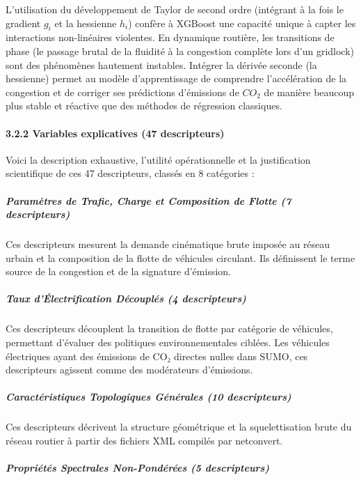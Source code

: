 \documentclass[10pt, a4paper]{article}
\begin{document}
L'utilisation du développement de Taylor de second ordre (intégrant à la
fois le gradient \(g_i\) et la hessienne \(h_i\)) confère à XGBoost une
capacité unique à capter les interactions non-linéaires violentes. En
dynamique routière, les transitions de phase (le passage brutal de la
fluidité à la congestion complète lors d'un gridlock) sont des
phénomènes hautement instables. Intégrer la dérivée seconde (la
hessienne) permet au modèle d'apprentissage de comprendre l'accélération
de la congestion et de corriger ses prédictions d'émissions de \(CO_2\)
de manière beaucoup plus stable et réactive que des méthodes de
régression classiques.

\paragraph{3.2.2 Variables explicatives (47
descripteurs)}\label{variables-explicatives-47-descripteurs}

Voici la description exhaustive, l'utilité opérationnelle et la
justification scientifique de ces 47 descripteurs, classés en 8
catégories :

\subparagraph{Paramètres de Trafic, Charge et Composition de Flotte (7
descripteurs)}\label{paramuxe8tres-de-trafic-charge-et-composition-de-flotte-7-descripteurs}

Ces descripteurs mesurent la demande cinématique brute imposée au réseau
urbain et la composition de la flotte de véhicules circulant. Ils
définissent le terme source de la congestion et de la signature
d'émission.

\subparagraph{Taux d'Électrification Découplés (4
descripteurs)}\label{taux-duxe9lectrification-duxe9coupluxe9s-4-descripteurs}

Ces descripteurs découplent la transition de flotte par catégorie de
véhicules, permettant d'évaluer des politiques environnementales
ciblées. Les véhicules électriques ayant des émissions de CO₂ directes
nulles dans SUMO, ces descripteurs agissent comme des modérateurs
d'émissions.

\subparagraph{Caractéristiques Topologiques Générales (10
descripteurs)}\label{caractuxe9ristiques-topologiques-guxe9nuxe9rales-10-descripteurs}

Ces descripteurs décrivent la structure géométrique et la
squelettisation brute du réseau routier à partir des fichiers XML
compilés par netconvert.

\subparagraph{Propriétés Spectrales Non-Pondérées (5
descripteurs)}\label{propriuxe9tuxe9s-spectrales-non-ponduxe9ruxe9es-5-descripteurs}
\end{document}
